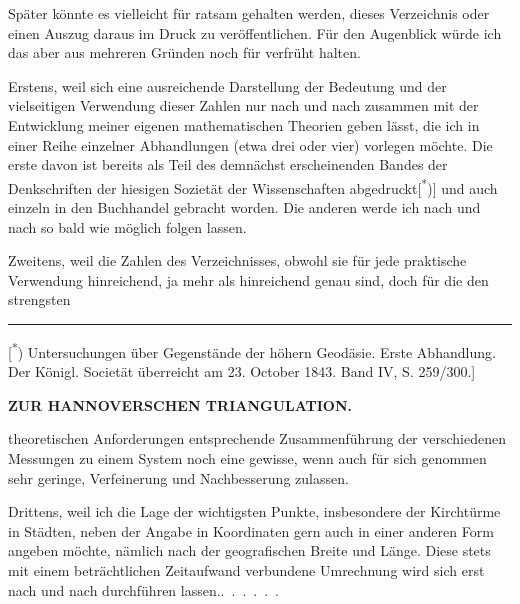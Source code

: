 \par\noindent\hspace*{\parindent}Später könnte es vielleicht für ratsam gehalten werden, dieses Verzeichnis oder einen Auszug daraus im Druck zu veröffentlichen. Für den Augenblick würde ich das aber aus mehreren Gründen noch für verfrüht halten.

\par\noindent\hspace*{\parindent}Erstens, weil sich eine  ausreichende Darstellung der Bedeutung und der vielseitigen Verwendung dieser Zahlen nur nach und nach zusammen mit der Entwicklung meiner eigenen mathematischen Theorien geben lässt, die ich in einer Reihe einzelner Abhandlungen (etwa drei oder vier) vorlegen möchte. Die erste davon ist bereits als Teil des demnächst erscheinenden Bandes der Denkschriften der hiesigen Sozietät der Wissenschaften abgedruckt[\textsuperscript{*})] und auch einzeln in den Buchhandel gebracht worden. Die anderen werde ich nach und nach so bald wie möglich folgen lassen.

\par\noindent\hspace*{\parindent}Zweitens, weil die Zahlen des Verzeichnisses, obwohl sie für jede praktische Verwendung hinreichend, ja mehr als hinreichend genau sind, doch für die den strengsten

\par\smallskip\noindent\rule{.24\linewidth}{.4pt}\par\smallskip
{\footnotesize\noindent\hspace*{\parindent}[\textsuperscript{*}) Untersuchungen über Gegenstände der höhern Geodäsie. Erste Abhandlung. Der Königl. Societät überreicht am 23. October 1843. Band IV, S. 259/300.]\par}

\par\clearpage
\noindent\null\hfill{\small\textbf{ZUR HANNOVERSCHEN TRIANGULATION.}}\hfill{}\par\medskip

\noindent theoretischen Anforderungen entsprechende Zusammenführung der verschiedenen Messungen zu einem System noch eine gewisse, wenn auch für sich genommen sehr geringe, Verfeinerung und Nachbesserung zulassen.

\par\noindent\hspace*{\parindent}Drittens, weil ich die Lage der wichtigsten Punkte, insbesondere der Kirchtürme in Städten, neben der Angabe in Koordinaten gern auch in einer anderen Form angeben möchte, nämlich nach der geografischen Breite und Länge. Diese stets mit einem beträchtlichen Zeitaufwand verbundene Umrechnung wird sich erst nach und nach durchführen \mbox{lassen.\quad\mbox{.\ .\ .\ .\ .\ .}}

